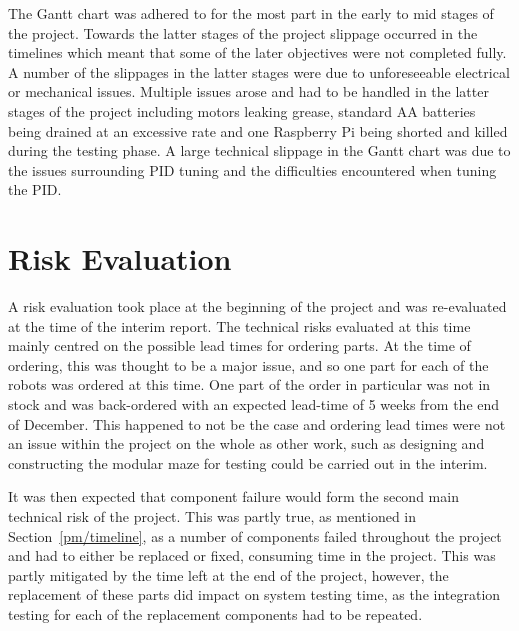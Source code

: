 The Gantt chart was adhered to for the most part in the early to 
mid stages of the project. Towards the latter stages of the 
project slippage occurred in the timelines which meant that some 
of the later objectives were not completed fully. A number 
of the slippages in the latter stages were due to unforeseeable 
electrical or mechanical issues. Multiple issues arose and had to 
be handled in the latter stages of the project including motors 
leaking grease, standard AA batteries being drained at an 
excessive rate and one Raspberry Pi being shorted and killed 
during the testing phase. A large technical slippage in the Gantt 
chart was due to the issues surrounding PID tuning and the 
difficulties encountered when tuning the PID. 



\section{Risk Evaluation}\label{pm/riskeval}
A risk evaluation took place at the beginning of the project and 
was re-evaluated at the time of the interim report. The technical 
risks evaluated at this time mainly centred on the possible lead 
times for ordering parts. At the time of ordering, this was 
thought to be a major issue, and so one part for each of the 
robots was ordered at this time. One part of the order in 
particular was not in stock and was back-ordered with an expected 
lead-time of 5 weeks from the end of December. This happened to 
not be the case and ordering lead times were not an issue within 
the project on the whole as other work, such as designing and 
constructing the modular maze for testing could be carried out in 
the interim. 

It was then expected that component failure would form the second 
main technical risk of the project. This was partly true, as 
mentioned in Section~\ref{pm/timeline}, as a number of components 
failed throughout the project and had to either be replaced or 
fixed, consuming time in the project. This was partly mitigated by 
the time left at the end of the project, however, the replacement 
of these parts did impact on system testing time, as the 
integration testing for each of the replacement components had to 
be repeated. 


